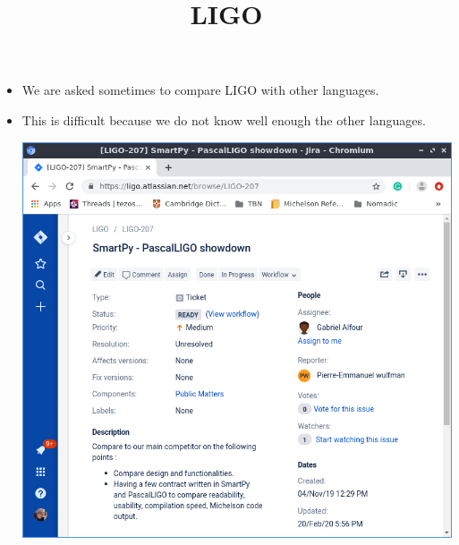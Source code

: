 \documentclass[wide]{slides}
\begin{document}
\begin{slide}
  \title{LIGO}

  \begin{itemize}

    \item We are asked sometimes to compare LIGO with other languages.

    \item This is difficult because we do not know well enough the
      other languages.
      \begin{center}
        \includegraphics[scale=0.3]{ligo_smartpy.png}
      \end{center}

  \end{itemize}

\end{slide}
\end{document}

